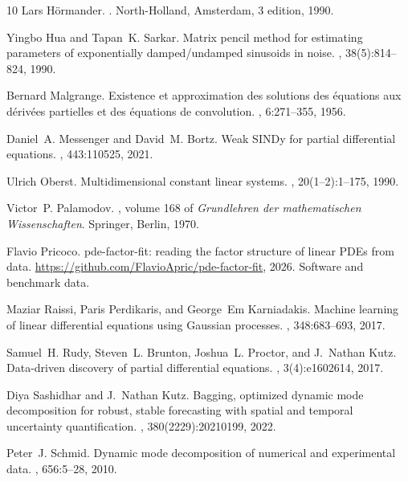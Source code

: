 \documentclass[11pt]{article}
\theoremstyle{plain}
\theoremstyle{definition}
\theoremstyle{remark}
\begin{document}
\begin{thebibliography}{10}
Lars H{\"o}rmander.
.
\newblock North-Holland, Amsterdam, 3 edition, 1990.

Yingbo Hua and Tapan~K. Sarkar.
\newblock Matrix pencil method for estimating parameters of exponentially
  damped/undamped sinusoids in noise.
,
  38(5):814--824, 1990.

Bernard Malgrange.
\newblock Existence et approximation des solutions des {\'e}quations aux
  d{\'e}riv{\'e}es partielles et des {\'e}quations de convolution.
, 6:271--355, 1956.

Daniel~A. Messenger and David~M. Bortz.
\newblock Weak {SINDy} for partial differential equations.
, 443:110525, 2021.

Ulrich Oberst.
\newblock Multidimensional constant linear systems.
, 20(1--2):1--175, 1990.

Victor~P. Palamodov.
,
  volume 168 of {\em Grundlehren der mathematischen Wissenschaften}.
\newblock Springer, Berlin, 1970.

Flavio Pricoco.
\newblock pde-factor-fit: reading the factor structure of linear {PDE}s from data.
\newblock \url{https://github.com/FlavioApric/pde-factor-fit}, 2026.
\newblock Software and benchmark data.

Maziar Raissi, Paris Perdikaris, and George~Em Karniadakis.
\newblock Machine learning of linear differential equations using {G}aussian
  processes.
, 348:683--693, 2017.

Samuel~H. Rudy, Steven~L. Brunton, Joshua~L. Proctor, and J.~Nathan Kutz.
\newblock Data-driven discovery of partial differential equations.
, 3(4):e1602614, 2017.

Diya Sashidhar and J.~Nathan Kutz.
\newblock Bagging, optimized dynamic mode decomposition for robust, stable
  forecasting with spatial and temporal uncertainty quantification.
,
  380(2229):20210199, 2022.

Peter~J. Schmid.
\newblock Dynamic mode decomposition of numerical and experimental data.
, 656:5--28, 2010.

\end{thebibliography}
\end{document}
